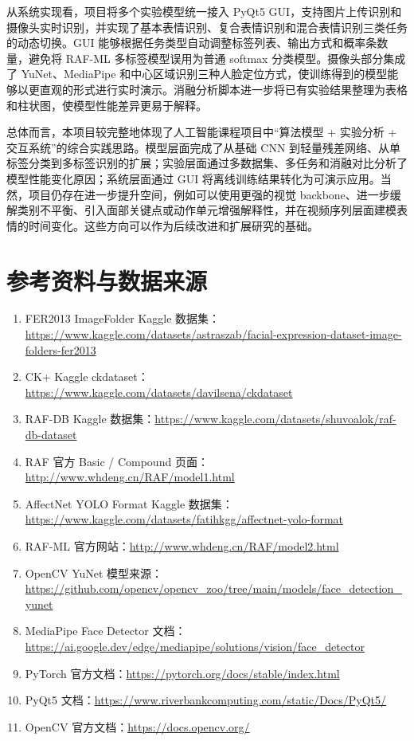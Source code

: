 \documentclass[UTF8,a4paper,12pt]{ctexart}
\begin{document}
从系统实现看，项目将多个实验模型统一接入 PyQt5 GUI，支持图片上传识别和摄像头实时识别，并实现了基本表情识别、复合表情识别和混合表情识别三类任务的动态切换。GUI 能够根据任务类型自动调整标签列表、输出方式和概率条数量，避免将 RAF-ML 多标签模型误用为普通 softmax 分类模型。摄像头部分集成了 YuNet、MediaPipe 和中心区域识别三种人脸定位方式，使训练得到的模型能够以更直观的形式进行实时演示。消融分析脚本进一步将已有实验结果整理为表格和柱状图，使模型性能差异更易于解释。

总体而言，本项目较完整地体现了人工智能课程项目中“算法模型 + 实验分析 + 交互系统”的综合实践思路。模型层面完成了从基础 CNN 到轻量残差网络、从单标签分类到多标签识别的扩展；实验层面通过多数据集、多任务和消融对比分析了模型性能变化原因；系统层面通过 GUI 将离线训练结果转化为可演示应用。当然，项目仍存在进一步提升空间，例如可以使用更强的视觉 backbone、进一步缓解类别不平衡、引入面部关键点或动作单元增强解释性，并在视频序列层面建模表情的时间变化。这些方向可以作为后续改进和扩展研究的基础。

\section{参考资料与数据来源}

\begingroup
\small
\sloppy
\begin{enumerate}
  \item FER2013 ImageFolder Kaggle 数据集：\url{https://www.kaggle.com/datasets/astraszab/facial-expression-dataset-image-folders-fer2013}
  \item CK+ Kaggle ckdataset：\url{https://www.kaggle.com/datasets/davilsena/ckdataset}
  \item RAF-DB Kaggle 数据集：\url{https://www.kaggle.com/datasets/shuvoalok/raf-db-dataset}
  \item RAF 官方 Basic / Compound 页面：\url{http://www.whdeng.cn/RAF/model1.html}
  \item AffectNet YOLO Format Kaggle 数据集：\url{https://www.kaggle.com/datasets/fatihkgg/affectnet-yolo-format}
  \item RAF-ML 官方网站：\url{http://www.whdeng.cn/RAF/model2.html}
  \item OpenCV YuNet 模型来源：\url{https://github.com/opencv/opencv_zoo/tree/main/models/face_detection_yunet}
  \item MediaPipe Face Detector 文档：\url{https://ai.google.dev/edge/mediapipe/solutions/vision/face_detector}
  \item PyTorch 官方文档：\url{https://pytorch.org/docs/stable/index.html}
  \item PyQt5 文档：\url{https://www.riverbankcomputing.com/static/Docs/PyQt5/}
  \item OpenCV 官方文档：\url{https://docs.opencv.org/}
\end{enumerate}
\endgroup
\end{document}
